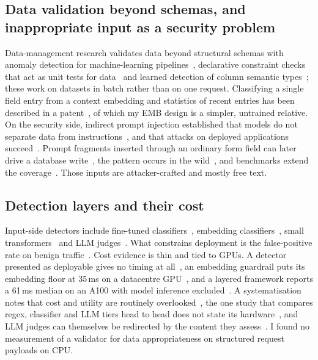 \documentclass[conference]{IEEEtran}
\begin{document}
\subsection{Data validation beyond schemas, and inappropriate input as a security problem}
Data-management research validates data beyond structural schemas with anomaly detection for
machine-learning pipelines~\cite{polyzotis2019datavalidation}, declarative constraint checks that act as
unit tests for data~\cite{schelter2018deequ} and learned detection of column semantic
types~\cite{hulsebos2019sherlock}; these work on datasets in batch rather than on one request.
Classifying a single field entry from a context embedding and statistics of recent entries has been
described in a patent~\cite{banerjee2025contextembedding}, of which my EMB design is a simpler,
untrained relative. On the security side, indirect prompt injection established that models do not
separate data from instructions~\cite{greshake2023indirect}, and that attacks on deployed applications
succeed~\cite{kaya2026chatbotplugins}. Prompt fragments inserted through an ordinary form field
can later drive a database write~\cite{pedro2025p2sql}, the pattern occurs in the
wild~\cite{khodayari2026ipiwild}, and benchmarks extend the
coverage~\cite{yi2025bipia,evtimov2025wasp}.
Those inputs are attacker-crafted and mostly free text.

\subsection{Detection layers and their cost}
Input-side detectors include fine-tuned classifiers~\cite{jacob2025promptshield}, embedding
classifiers~\cite{ayub2024embedding,ahmed2026reflexguard}, small
transformers~\cite{datta2025javelinguard} and LLM judges~\cite{rebedea2023nemo}. What constrains deployment is the false-positive rate on
benign traffic~\cite{li2024injecguard}. Cost evidence is thin and tied to GPUs. A detector presented as
deployable gives no timing at all~\cite{jacob2025promptshield}, an embedding guardrail puts its
embedding floor at 35\,ms on a datacentre GPU~\cite{ahmed2026reflexguard}, and a layered framework
reports a 61\,ms median on an A100 with model inference excluded~\cite{saleem2026layered}. A systematisation notes
that cost and utility are routinely overlooked~\cite{wang2026sokguardrails}, the one study that
compares regex, classifier and LLM tiers head to head does not state its
hardware~\cite{maiorano2026tradeoffs}, and LLM judges can themselves be redirected by the content they
assess~\cite{shi2024judgeattack}. I found no measurement of a validator for data appropriateness on
structured request payloads on CPU.
\end{document}
